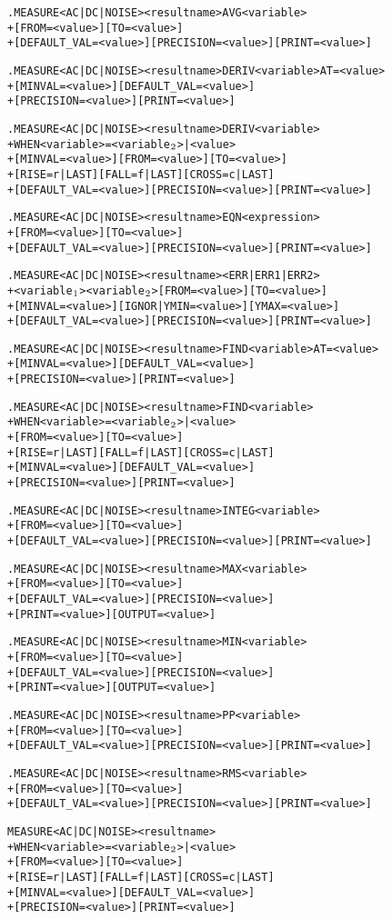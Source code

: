 \begin{Command}
\begin{alltt}
.MEASURE <AC|DC|NOISE> <result name> AVG <variable>
+ [FROM=<value>] [TO=<value>]
+ [DEFAULT_VAL=<value>] [PRECISION=<value>] [PRINT=<value>]

.MEASURE <AC|DC|NOISE> <result name> DERIV <variable> AT=<value>
+ [MINVAL=<value>] [DEFAULT_VAL=<value>]
+ [PRECISION=<value>] [PRINT=<value>]

.MEASURE <AC|DC|NOISE> <result name> DERIV <variable>
+ WHEN <variable>=<variable\(\sb{2}\)>|<value>
+ [MINVAL=<value>] [FROM=<value>] [TO=<value>]
+ [RISE=r|LAST] [FALL=f|LAST] [CROSS=c|LAST]
+ [DEFAULT_VAL=<value>] [PRECISION=<value>] [PRINT=<value>]

.MEASURE <AC|DC|NOISE> <result name> EQN <expression> 
+ [FROM=<value>] [TO=<value>] 
+ [DEFAULT_VAL=<value>] [PRECISION=<value>] [PRINT=<value>]

.MEASURE <AC|DC|NOISE> <result name> <ERR|ERR1|ERR2>
+ <variable\(\sb{1}\)> <variable\(\sb{2}\)> [FROM=<value>] [TO=<value>]
+ [MINVAL=<value>] [IGNOR|YMIN=<value>] [YMAX=<value>]
+ [DEFAULT_VAL=<value>] [PRECISION=<value>] [PRINT=<value>]

.MEASURE <AC|DC|NOISE> <result name> FIND <variable> AT=<value>
+ [MINVAL=<value>] [DEFAULT_VAL=<value>]
+ [PRECISION=<value>] [PRINT=<value>]

.MEASURE <AC|DC|NOISE> <result name> FIND <variable>
+ WHEN <variable>=<variable\(\sb{2}\)>|<value>
+ [FROM=<value>] [TO=<value>]
+ [RISE=r|LAST] [FALL=f|LAST] [CROSS=c|LAST]
+ [MINVAL=<value>] [DEFAULT_VAL=<value>]
+ [PRECISION=<value>] [PRINT=<value>]

.MEASURE <AC|DC|NOISE> <result name> INTEG <variable>
+ [FROM=<value>] [TO=<value>]
+ [DEFAULT_VAL=<value>] [PRECISION=<value>] [PRINT=<value>]

.MEASURE <AC|DC|NOISE> <result name> MAX <variable>
+ [FROM=<value>] [TO=<value>] 
+ [DEFAULT_VAL=<value>] [PRECISION=<value>] 
+ [PRINT=<value>] [OUTPUT=<value>]

.MEASURE <AC|DC|NOISE> <result name> MIN <variable>
+ [FROM=<value>] [TO=<value>] 
+ [DEFAULT_VAL=<value>] [PRECISION=<value>]
+ [PRINT=<value>] [OUTPUT=<value>]

.MEASURE <AC|DC|NOISE> <result name> PP <variable>
+ [FROM=<value>] [TO=<value>] 
+ [DEFAULT_VAL=<value>] [PRECISION=<value>] [PRINT=<value>]

.MEASURE <AC|DC|NOISE> <result name> RMS <variable>
+ [FROM=<value>] [TO=<value>]
+ [DEFAULT_VAL=<value>] [PRECISION=<value>] [PRINT=<value>]

MEASURE <AC|DC|NOISE> <result name>
+ WHEN <variable>=<variable\(\sb{2}\)>|<value>
+ [FROM=<value>] [TO=<value>]
+ [RISE=r|LAST] [FALL=f|LAST] [CROSS=c|LAST]
+ [MINVAL=<value>] [DEFAULT_VAL=<value>]
+ [PRECISION=<value>] [PRINT=<value>]


\end{alltt}
\end{Command}
